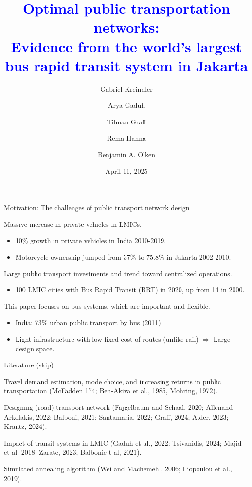 \documentclass[notes,11pt, aspectratio=169]{beamer}
\title{\textcolor{blue}{Optimal public transportation networks:\\ \normalsize Evidence from the world's largest bus rapid transit system in Jakarta}}
\author{Gabriel Kreindler \and Arya Gaduh \and Tilman Graff \and Rema Hanna \and Benjamin A. Olken}
\institute{\textit{Conditionally accepted, AER}\\\vspace{1em} \large Presenter: Hyoungchul Kim}
\date{April 11, 2025}
\newenvironment{wideitemize}{\itemize\addtolength{\itemsep}{0.4em}}{\enditemize}
\begin{document}
\begin{frame}[plain]
	\titlepage
\end{frame}

\setcounter{framenumber}{0}

\begin{frame}{Motivation: The challenges of public transport network design}
	\begin{wideitemize}
		\item Massive increase in private vehicles in LMICs.
			\begin{itemize}
				\item 10\% growth in private vehicles in India 2010-2019.
				\item Motorcycle ownership jumped from 37\% to 75.8\% in Jakarta 2002-2010. 
			\end{itemize}
		\item Large public transport investments and trend toward centralized operations.
			\begin{itemize}
				\item 100 LMIC cities with Bus Rapid Transit (BRT) in 2020, up from 14 in 2000.
			\end{itemize}
		\item This paper focuses on bus systems, which are important and flexible.
			\begin{itemize}
				\item India: 73\% urban public transport by bus (2011).
				\item Light infrastructure with low fixed cost of routes (unlike rail) $\Rightarrow$ Large design space.
			\end{itemize}
	\end{wideitemize}	
\end{frame}

\begin{frame}{Literature (skip)}
\begin{wideitemize}
\item Travel demand estimation, mode choice, and increasing returns in public transportation (McFadden 174; Ben-Akiva et al., 1985, Mohring, 1972).
\item Designing (road) transport network (Fajgelbaum and Schaal, 2020; Allenand Arkolakis, 2022; Balboni, 2021; Santamaria, 2022; Graff, 2024; Alder, 2023; Krantz, 2024).
\item Impact of transit systems in LMIC (Gaduh et al., 2022; Tsivanidis, 2024; Majid et al, 2018; Zarate, 2023; Balbonie t al, 2021).
\item Simulated annealing algorithm (Wei and Machemehl, 2006; Iliopoulou et al., 2019).
\end{wideitemize}	
\end{frame}
\end{document}
